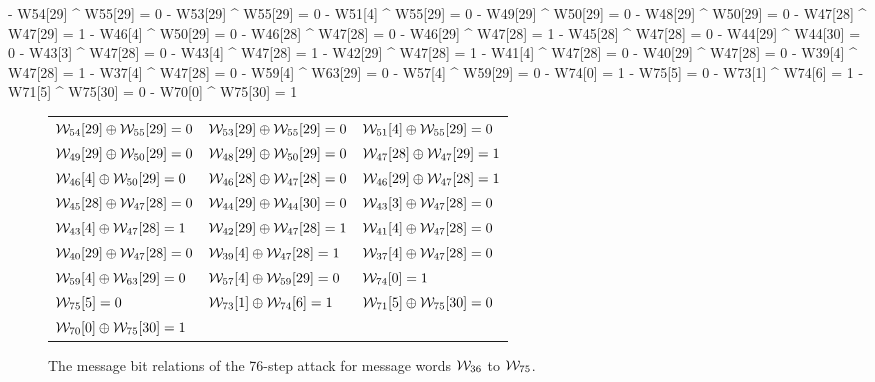 \begingroup
\fontsize{8pt}{9pt}\selectfont
\begin{verbbox}
- W54[29] ^ W55[29] = 0
- W53[29] ^ W55[29] = 0
- W51[4] ^ W55[29] = 0
- W49[29] ^ W50[29] = 0
- W48[29] ^ W50[29] = 0
- W47[28] ^ W47[29] = 1
- W46[4] ^ W50[29] = 0
- W46[28] ^ W47[28] = 0
- W46[29] ^ W47[28] = 1
- W45[28] ^ W47[28] = 0
- W44[29] ^ W44[30] = 0
- W43[3] ^ W47[28] = 0
- W43[4] ^ W47[28] = 1
- W42[29] ^ W47[28] = 1
- W41[4] ^ W47[28] = 0
- W40[29] ^ W47[28] = 0
- W39[4] ^ W47[28] = 1
- W37[4] ^ W47[28] = 0
- W59[4] ^ W63[29] = 0
- W57[4] ^ W59[29] = 0
- W74[0] = 1
- W75[5] = 0
- W73[1] ^ W74[6] = 1
- W71[5] ^ W75[30] = 0
- W70[0] ^ W75[30] = 1
\end{verbbox}
\endgroup
\begin{figure}
\begin{center}
\begin{tabular}{l l l}
 $\mathcal{W}_{54}[29] \oplus \mathcal{W}_{55}[29] = 0$ & $\mathcal{W}_{53}[29] \oplus \mathcal{W}_{55}[29] = 0$ & $\mathcal{W}_{51}[4]  \oplus \mathcal{W}_{55}[29] = 0$\\
 $\mathcal{W}_{49}[29] \oplus \mathcal{W}_{50}[29] = 0$ & $\mathcal{W}_{48}[29] \oplus \mathcal{W}_{50}[29] = 0$ & $\mathcal{W}_{47}[28] \oplus \mathcal{W}_{47}[29] = 1$\\
 $\mathcal{W}_{46}[4]  \oplus \mathcal{W}_{50}[29] = 0$ & $\mathcal{W}_{46}[28] \oplus \mathcal{W}_{47}[28] = 0$ & $\mathcal{W}_{46}[29] \oplus \mathcal{W}_{47}[28] = 1$\\
 $\mathcal{W}_{45}[28] \oplus \mathcal{W}_{47}[28] = 0$ & $\mathcal{W}_{44}[29] \oplus \mathcal{W}_{44}[30] = 0$ & $\mathcal{W}_{43}[3]  \oplus \mathcal{W}_{47}[28] = 0$\\
 $\mathcal{W}_{43}[4]  \oplus \mathcal{W}_{47}[28] = 1$ & $\mathcal{W}_{42}[29] \oplus \mathcal{W}_{47}[28] = 1$ & $\mathcal{W}_{41}[4]  \oplus \mathcal{W}_{47}[28] = 0$\\
 $\mathcal{W}_{40}[29] \oplus \mathcal{W}_{47}[28] = 0$ & $\mathcal{W}_{39}[4]  \oplus \mathcal{W}_{47}[28] = 1$ & $\mathcal{W}_{37}[4]  \oplus \mathcal{W}_{47}[28] = 0$\\
 $\mathcal{W}_{59}[4]  \oplus \mathcal{W}_{63}[29] = 0$ & $\mathcal{W}_{57}[4]  \oplus \mathcal{W}_{59}[29] = 0$ & $\mathcal{W}_{74}[0] = 1$\\ 
 $\mathcal{W}_{75}[5] = 0$ & $\mathcal{W}_{73}[1]  \oplus \mathcal{W}_{74}[6] = 1$ & $\mathcal{W}_{71}[5]  \oplus \mathcal{W}_{75}[30] = 0$\\
 $\mathcal{W}_{70}[0]  \oplus \mathcal{W}_{75}[30] = 1$\\
\end{tabular}
\end{center}
  \caption{The message bit relations of the 76-step attack for message words $\mathcal{W}_{36}$ to $\mathcal{W}_{75}$.
  \label{fig:msgbitrel76}}
\end{figure}

